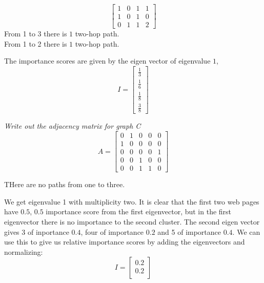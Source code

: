 \documentclass[letter]{article}
\newenvironment{menumerate}{\edef\backupindent{\the\parindent}
  \enumerate\setlength{\parindent}{\backupindent}}
  {\endenumerate}
\begin{document}
\begin{menumerate}
\begin{menumerate}
\begin{equation*}
\begin{bmatrix}
                1 & 0 & 1 & 1 \\
                1 & 0 & 1 & 0 \\
                0 & 1 & 1 & 2
            \end{bmatrix}
        \end{equation*}
        From 1 to 3 there is $1$ two-hop path. \\From 1 to 2 there is $1$ two-hop path.
        \item The importance scores are given by the eigen vector of eigenvalue $1$,
        \begin{equation*}
            I = \begin{bmatrix}
                \frac{1}{3} \\
                \frac{1}{6} \\
                \frac{1}{8} \\
                \frac{3}{8}
            \end{bmatrix}
        \end{equation*}
        \item \emph{Write out the adjacency matrix for graph C}
        \begin{equation*}
            A = \begin{bmatrix}
                0 & 1 & 0 & 0 & 0\\
                1 & 0 & 0 & 0 & 0\\
                0 & 0 & 0 & 0 & 1\\
                0 & 0 & 1 & 0 & 0\\
                0 & 0 & 1 & 1 & 0
            \end{bmatrix}
        \end{equation*}
        \item THere are no paths from one to three.
        \item We get eigenvalue 1 with multiplicity two. It is clear that
        the first two web pages have $0.5$, $0.5$ importance score from the first eigenvector, but in the first eigenvector there is no importance to the second cluster.
        The second eigen vector gives 3 of inportance $0.4$, four of importance $0.2$
        and  5 of importance $0.4$. We can use this to give us relative importance scores by adding the eigenvectors and normalizing:
        \begin{equation*}
            I = \begin{bmatrix}
                0.2 \\
                0.2 \\

\end{bmatrix}
\end{equation*}
\end{menumerate}
\end{menumerate}
\end{document}
